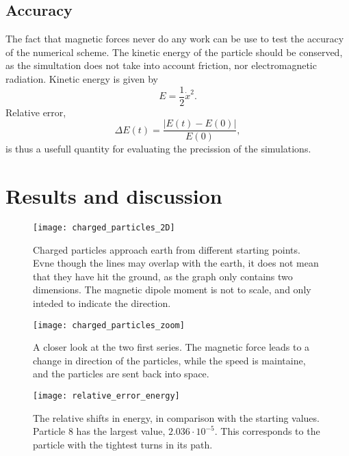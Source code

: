 \documentclass{article}
\begin{document}
        \subsection*{Accuracy}

        The fact that magnetic forces never do any work can be use to test the accuracy of the numerical scheme. The kinetic energy of the particle should be conserved, as the simultation does not take into account friction, nor electromagnetic radiation. Kinetic energy is given by
            $$
                E = \frac{1}{2}\dot x^2.
            $$
        Relative error,
            $$
                \Delta E(t) = \frac{|E(t) - E(0)|}{E(0)},
            $$
        is thus a usefull quantity for evaluating the precission of the simulations. 

    \section*{Results and discussion}
    
    \begin{figure}
        \vspace{-50px}
        \centering
        \texttt{[image: charged\_particles\_2D]}
        \caption{Charged particles approach earth from different starting points. Evne though the lines may overlap with the earth, it does not mean that they have hit the ground, as the graph only contains two dimensions. The magnetic dipole moment is not to scale, and only inteded to indicate the direction.}
        \label{Charged particles}
    \end{figure}

    \begin{figure}
        \vspace{-60px}
        \centering
        \texttt{[image: charged\_particles\_zoom]}
        \caption{A closer look at the two first series. The magnetic force leads to a change in direction of the particles, while the speed is maintaine, and the particles are sent back into space.}
        \label{Charged particles zoom}
    \end{figure}

    \begin{figure}
        \centering
        \texttt{[image: relative\_error\_energy]}
        \caption{The relative shifts in energy, in comparison with the starting values. Particle 8 has the largest value, $2.036 \cdot 10^{-5}$. This corresponds to the particle with the tightest turns in its path.}
        \label{Relative error}
    \end{figure}
\end{document}
